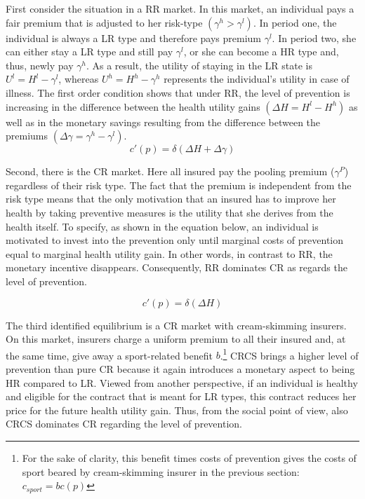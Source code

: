 \documentclass[12pt,english]{article}%
\begin{document}
First consider the situation in a RR market. In this market, an individual pays a fair premium that is adjusted to her risk-type $(\gamma^h>\gamma^l)$. In period one, the individual is always a LR type and therefore pays premium $\gamma^l$. In period two, she can either stay a LR type and still pay $\gamma^l$, or she can become a HR type and, thus, newly pay $\gamma^h$. As a result, the utility of staying in the LR state is $U^l=H^l-\gamma^l$, whereas $U^h=H^h-\gamma^h$ represents the individual's utility in case of illness. The first order condition shows that under RR, the level of prevention is increasing in the difference between the health utility gains $(\Delta{H}=H^l-H^h)$ as well as in the monetary savings resulting from the difference between the premiums $(\Delta\gamma=\gamma^h-\gamma^l)$.   
\begin{equation}
c'(p)=\delta(\Delta{H}+\Delta\gamma)
\end{equation}

Second, there is the CR market. Here all insured pay the pooling premium ($\gamma^{P}$) regardless of their risk type. The fact that the premium is independent from the risk type means that the only motivation that an insured has to improve her health by taking preventive measures is the utility that she derives from the health itself. To specify, as shown in the equation below, an individual is motivated to invest into the prevention only until marginal costs of prevention equal to marginal health utility gain. In other words, in contrast to RR, the monetary incentive disappears. Consequently, RR dominates CR as regards the level of prevention. 

\begin{equation}
c'(p)=\delta(\Delta{H})
\end{equation}

The third identified equilibrium is a CR market with cream-skimming insurers. On this market, insurers charge a uniform premium to all their insured and, at the same time, give away a sport-related benefit $b$.\footnote{For the sake of clarity, this benefit times costs of prevention gives the costs of sport beared by cream-skimming insurer in the previous section: $c_{sport}=bc(p)$} CRCS brings a higher level of prevention than pure CR because it again introduces a monetary aspect to being HR compared to LR. Viewed from another perspective, if an individual is healthy and eligible for the contract that is meant for LR types, this contract reduces her price for the future health utility gain. Thus, from the social point of view, also CRCS dominates CR regarding the level of prevention.  
\end{document}
